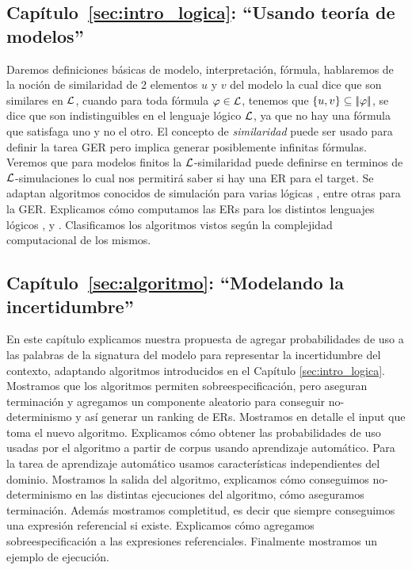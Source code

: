 \subsection{Cap\'itulo~\ref{sec:intro_logica}: ``Usando teor\'ia de modelos''} 
Daremos definiciones b\'asicas de modelo, 
interpretaci\'on, f\'ormula, hablaremos de la noci\'on de similaridad de 2 elementos $u$ y $v$ del modelo la cual dice que son 
similares en $\mathcal{L}$, cuando para toda f\'ormula $\varphi \in \mathcal{L}$, tenemos que 
$\{u,v\} \subseteq |\!|\varphi|\!|$, se dice que son indistinguibles en el lenguaje l\'ogico $\mathcal{L}$, ya que no hay una f\'ormula que satisfaga uno 
y no el otro. El concepto de \emph{similaridad} puede ser usado para definir la tarea GER pero implica generar posiblemente infinitas f\'ormulas. Veremos que para modelos finitos la $\mathcal{L}$-similaridad puede definirse en terminos de $\mathcal{L}$-simulaciones lo cual nos permitir\'a saber si hay una ER para el target. Se adaptan algoritmos conocidos de simulaci\'on para varias l\'ogicas \ALC, \EL entre otras para la GER. Explicamos c\'omo computamos las ERs para los distintos lenguajes l\'ogicos \EPFOL, \ALC y \EL. Clasificamos los algoritmos vistos seg\'un la complejidad computacional de los mismos. 

\subsection{Cap\'itulo~\ref{sec:algoritmo}: ``Modelando la incertidumbre''} 
En este cap\'itulo 
explicamos nuestra propuesta de agregar probabilidades de uso a las palabras de la signatura del modelo para representar la incertidumbre del contexto, adaptando algoritmos introducidos en el Cap\'itulo \ref{sec:intro_logica}. Mostramos que los algoritmos permiten sobreespecificaci\'on, 
pero aseguran terminaci\'on y agregamos un componente aleatorio para conseguir no-determinismo y as\'i generar un ranking de ERs. Mostramos en detalle el input que toma el
 nuevo algoritmo. Explicamos c\'omo obtener las probabilidades de uso usadas por el algoritmo a partir de corpus usando aprendizaje autom\'atico. Para la tarea de aprendizaje autom\'atico usamos caracter\'isticas independientes del dominio. 
Mostramos la salida del algoritmo, explicamos c\'omo conseguimos no-determinismo en las distintas ejecuciones del algoritmo, c\'omo aseguramos 
terminaci\'on. Adem\'as mostramos completitud, es decir que siempre conseguimos una expresi\'on referencial si existe. Explicamos c\'omo agregamos sobreespecificaci\'on a las expresiones referenciales. Finalmente mostramos un ejemplo de ejecuci\'on. 

